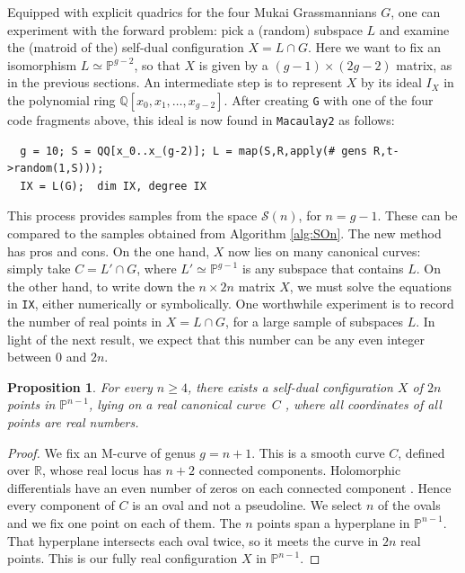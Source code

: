 \documentclass[12pt]{extarticle}
\newtheorem{proposition}[theorem]{Proposition}
\theoremstyle{definition}
\numberwithin{theorem}{section}
\theoremstyle{plain}\newtheorem{ithm}{Theorem}
\newcommand{\PP}{\mathbb{P}}
\newcommand{\RR}{\mathbb{R}}
\newcommand{\QQ}{\mathbb{Q}}
\begin{document}
 Equipped with explicit quadrics for the four Mukai Grassmannians $G$,
one can experiment with the forward problem: pick a (random)
subspace $L$ and examine the
(matroid of the) self-dual configuration $X = L \cap G$.
Here we want to fix an isomorphism $L \simeq \PP^{g-2}$,
so that $X$ is given by a $(g-1) \times (2g-2)$ matrix, 
as in the previous sections. An intermediate step is
to represent $X$ by its
ideal $I_X$ in the polynomial ring
$\QQ[x_0,x_1,\ldots,x_{g-2}]$.
After creating {\tt G} with one of the  four code fragments above,
this ideal is now found in {\tt Macaulay2} as follows:
\begin{small}
\begin{verbatim}
  g = 10; S = QQ[x_0..x_(g-2)]; L = map(S,R,apply(# gens R,t->random(1,S)));
  IX = L(G);  dim IX, degree IX
\end{verbatim}
\end{small}

This process provides samples from the space
$\mathcal{S}(n)$, for $n=g-1$. These
can be compared to the samples obtained from 
Algorithm \ref{alg:SOn}. The new method has pros and cons.
On the one hand, $X$ now lies on many canonical curves:
simply take $C = L' \cap G$, where $L' \simeq \PP^{g-1}$
is any subspace that contains $L$.
On the other hand, to write down the 
$n \times 2n$ matrix $X$, 
we must solve the equations in {\tt IX},
either numerically or symbolically.
One worthwhile experiment is to
record  the number of real points in $X = L \cap G$,
for a large sample of subspaces $L$.
In light of the next result,
we expect that this number can
be any even integer between $0$ and $2n$.


\begin{proposition}
For every $n \geq 4$, there exists a self-dual configuration $X$
of $2n$ points in $\PP^{n-1}$, lying on a real canonical curve $\,C$ ,
where all coordinates of all points are real numbers.
\end{proposition}

\begin{proof} We fix an M-curve of genus $g=n+1$.
This is a smooth curve $C$, defined over $\RR$, whose real locus has $n+2$ connected components. 
Holomorphic differentials have an even number of zeros on each connected
component \cite[Corollary 4.2.2]{CP}.
Hence every component of $C$ is an oval and not a pseudoline. We select $n$ of the ovals and we fix
one point on each of them. The $n$ points span a hyperplane in $\PP^{n-1}$.
That hyperplane
intersects each oval twice, so
it meets the curve in $2n$ real points.
This is our fully real configuration $X$ in $\PP^{n-1}$.
\end{proof}
   
\end{document}
